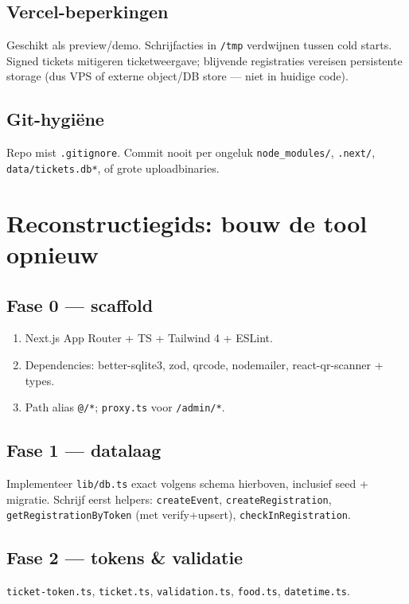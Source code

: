 \documentclass[11pt,a4paper]{report}
\begin{document}
\section{Vercel-beperkingen}
Geschikt als preview/demo. Schrijfacties in \texttt{/tmp} verdwijnen tussen cold starts.
Signed tickets mitigeren ticketweergave; blijvende registraties vereisen persistente storage
(dus VPS of externe object/DB store --- niet in huidige code).

\section{Git-hygiëne}
Repo mist \texttt{.gitignore}. Commit nooit per ongeluk \texttt{node\_modules/},
\texttt{.next/}, \texttt{data/tickets.db*}, of grote uploadbinaries.

\chapter{Reconstructiegids: bouw de tool opnieuw}

\section{Fase 0 --- scaffold}
\begin{enumerate}[leftmargin=*]
  \item Next.js App Router + TS + Tailwind 4 + ESLint.
  \item Dependencies: better-sqlite3, zod, qrcode, nodemailer, react-qr-scanner + types.
  \item Path alias \texttt{@/*}; \texttt{proxy.ts} voor \texttt{/admin/*}.
\end{enumerate}

\section{Fase 1 --- datalaag}
Implementeer \texttt{lib/db.ts} exact volgens schema hierboven, inclusief seed + migratie.
Schrijf eerst helpers: \texttt{createEvent}, \texttt{createRegistration},
\texttt{getRegistrationByToken} (met verify+upsert), \texttt{checkInRegistration}.

\section{Fase 2 --- tokens \& validatie}
\texttt{ticket-token.ts}, \texttt{ticket.ts}, \texttt{validation.ts}, \texttt{food.ts}, \texttt{datetime.ts}.
\end{document}

